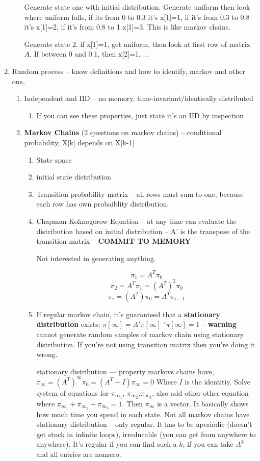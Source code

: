 \documentclass{report}
\begin{document}
\begin{enumerate}
\begin{enumerate}
Generate state one with initial distribution. Generate uniform then look where uniform falls, if its from 0 to 0.3 it's x[1]=1, if it's from 0.3 to 0.8 it's x[1]=2, if it's from 0.8 to 1 x[1]=3. This is like markov chains.

Generate state 2. if x[1]=1, get uniform, then look at first row of matrix $A$. If between 0 and 0.1, then x[2]=1, ...
 
 \end{enumerate}
 \item Random process -- know definitions and how to identify, markov and other one, 
 \begin{enumerate}
 \item Independent and IID -- no memory, time-invariant/identically distributed
 \begin{enumerate}
 \item If you can see these properties, just state it's an IID by inspection
\end{enumerate}  
 \item \textbf{Markov Chains} (2 questions on markov chains) -- conditional probability, X[k] depends on X[k-1]
 \begin{enumerate}
 \item State space
 \item initial state distribution
 \item Transition probability matrix -- all rows must sum to one, because each row has own probaiblity distribution. 
 \item Chapman-Kolmogorow Equation -- at any time can evaluate the distribution based on initial distribution -- A' is the transpose of the transition matrix -- \textbf{COMMIT TO MEMORY}
 
 
Not interested in generating anything. 

$$\pi_1 = A^T \pi_0$$
$$\pi_2 = A^T \pi_1 = (A^T)^2 \pi_0$$
$$\pi_i = (A^T)\pi_0 = A^T \pi_{i-1}$$ 
 
 \item If regular markov chain, it's guaranteed that a \textbf{stationary distribution} exists: 
 $\pi[\infty] = A'\pi[\infty]$ $'\pi[\infty]=1$ -- \textbf{warning} cannot generate random samples of markov chain using stationary distribution. If you're not using transition matrix then you're doing it wrong.
 
stationary distribution --- property markovs chains have, $\pi_\infty = (A^T)^\infty \pi_0 = (A^T - I)\pi_{\infty} = 0$ Where $I$ is the identitiy. Solve system of equations for $\pi_{\infty_1}$, $\pi_{\infty_2}$,$\pi_{\infty_3}$, also add other other equation where $\pi_{\infty_1} + \pi_{\infty_2} + \pi_{\infty_3} = 1$. Then $\pi_\infty$ is a vector. It basically shows how much time you spend in each state. Not all markov chains have stationary distribution -- only regular. It has to be aperiodic (doesn't get stuck in infinite loops), irreducable (you can get from anywhere to anywhere). It's regular if you can find such a $k$, if you can take $A^k$ and all entries are nonzero. 




\end{enumerate}
\end{enumerate}
\end{enumerate}
\end{document}
